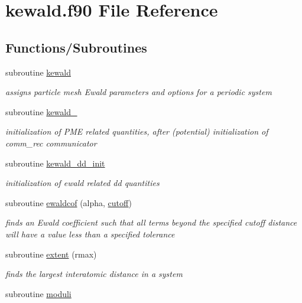 \hypertarget{kewald_8f90}{\section{kewald.\-f90 File Reference}
\label{kewald_8f90}
}
\subsection*{Functions/\-Subroutines}
\begin{DoxyCompactItemize}
\item 
subroutine \hyperlink{kewald_8f90_a99d092c73b96aeeeb2375f3394cf0d23}{kewald}
\begin{DoxyCompactList}\small\item\em assigns particle mesh Ewald parameters and options for a periodic system \end{DoxyCompactList}\item 
subroutine \hyperlink{kewald_8f90_a3c35ea7b8a215d2b1432381cbdf76665}{kewald\-\_}
\begin{DoxyCompactList}\small\item\em initialization of P\-M\-E related quantities, after (potential) initialization of comm\-\_\-rec communicator \end{DoxyCompactList}\item 
subroutine \hyperlink{kewald_8f90_a1b7a2a5b5e34b21f5ede1ea05da23cbf}{kewald\-\_\-dd\-\_\-init}
\begin{DoxyCompactList}\small\item\em initialization of ewald related dd quantities \end{DoxyCompactList}\item 
subroutine \hyperlink{kewald_8f90_a8fbba57fab0ff687d063dd5ff6551407}{ewaldcof} (alpha, \hyperlink{classcutoff}{cutoff})
\begin{DoxyCompactList}\small\item\em finds an Ewald coefficient such that all terms beyond the specified cutoff distance will have a value less than a specified tolerance \end{DoxyCompactList}\item 
subroutine \hyperlink{kewald_8f90_ac76eaab5e7eea01f0c1f678d7f7a65ad}{extent} (rmax)
\begin{DoxyCompactList}\small\item\em finds the largest interatomic distance in a system \end{DoxyCompactList}\item 
subroutine \hyperlink{kewald_8f90_abca796cdd6ef9c39457169094d79e430}{moduli}

\end{DoxyCompactItemize}
